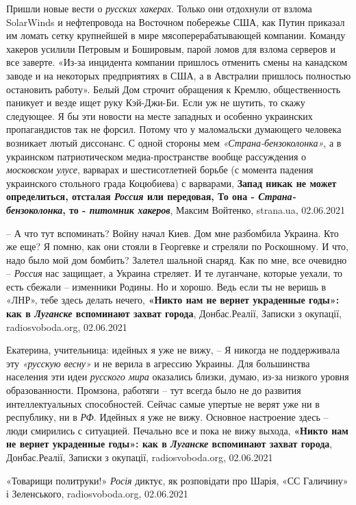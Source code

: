 Пришли новые вести о \emph{русских хакерах}. Только они отдохнули от взлома
SolarWinds и нефтепровода на Восточном побережье США, как Путин приказал им
ломать сетку крупнейшей в мире мясоперерабатывающей компании. Команду хакеров
усилили Петровым и Бошировым, парой ломов для взлома серверов и все заверте.
«Из-за инцидента компании пришлось отменить смены на канадском заводе и на
некоторых предприятиях в США, а в Австралии пришлось полностью остановить
работу». Белый Дом строчит обращения к Кремлю, общественность паникует и везде
ищет руку Кэй-Джи-Би. Если уж не шутить, то скажу следующее. Я бы эти новости
на месте западных и особенно украинских пропагандистов так не форсил. Потому
что у маломальски думающего человека возникает лютый диссонанс. С одной стороны
мем \emph{«Страна-бензоколонка»}, а в украинском патриотическом
медиа-пространстве вообще рассуждения о \emph{московском улусе}, варварах и
шестисотлетней борьбе (с момента падения украинского стольного града Коцюбиева)
с варварами,
\textbf{Запад никак не может определиться, отсталая \emph{Россия} или передовая, То она - \emph{Страна-бензоколонка}, то - \emph{питомник хакеров}},
Максим Войтенко, strana.ua, 02.06.2021

– А что тут вспоминать? Войну начал Киев. Дом мне разбомбила Украина. Кто же
еще? Я помню, как они стояли в Георгевке и стреляли по Роскошному. И что, надо
было мой дом бомбить? Залетел шальной снаряд. Как по мне, все очевидно – \emph{Россия}
нас защищает, а Украина стреляет. И те луганчане, которые уехали, то есть
сбежали – изменники Родины. Но и хорошо. Ведь если ты не веришь в «ЛНР», тебе
здесь делать нечего,
\textbf{«Никто нам не вернет украденные годы»: как в \emph{Луганске} вспоминают захват города},
Донбас.Реалії, Записки з окупації, radiosvoboda.org, 02.06.2021

Екатерина, учительница: идейных я уже не вижу, – Я никогда не поддерживала эту
\emph{«русскую весну»} и не верила в агрессию Украины. Для большинства населения эти
идеи \emph{русского мира} оказались близки, думаю, из-за низкого уровня
образованности. Промзона, работяги – тут всегда было не до развития
интеллектуальных способностей. Сейчас самые упертые не верят уже ни в
республику, ни в \emph{РФ}. Идейных я уже не вижу. Основное настроение здесь – люди
смирились с ситуацией. Печально все и пока не вижу выхода,
\textbf{«Никто нам не вернет украденные годы»: как в \emph{Луганске} вспоминают захват города},
Донбас.Реалії, Записки з окупації, radiosvoboda.org, 02.06.2021

«Товарищи политруки!» \emph{Росія} диктує, як розповідати про Шарія, «СС Галичину» і Зеленського,
radiosvoboda.org, 02.06.2021

